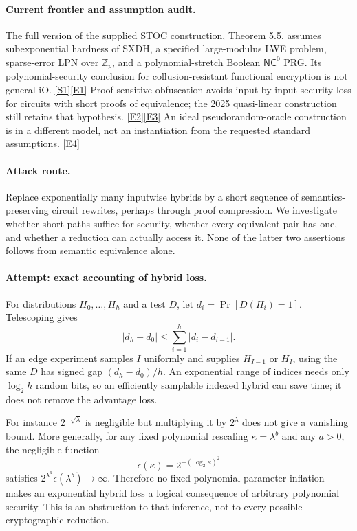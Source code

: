\documentclass[11pt,a4paper]{article}
\newcommand{\Z}{\mathbb{Z}}
\newcommand{\sref}[2]{\hyperlink{source:#1:#2}{[S#2]}}
\newcommand{\eref}[2]{\hyperlink{extra:#1:#2}{[E#2]}}
\numberwithin{equation}{section}
\begin{document}
\paragraph{Current frontier and assumption audit.}
The full version of the supplied STOC construction, Theorem 5.5, assumes
subexponential hardness of SXDH, a specified large-modulus LWE problem,
sparse-error LPN over $\Z_p$, and a polynomial-stretch Boolean
$\mathsf{NC}^0$ PRG. Its polynomial-security conclusion for collusion-resistant
functional encryption is not general iO. \sref{statement}{1}\eref{statement}{1}
Proof-sensitive obfuscation avoids input-by-input security loss for circuits
with short proofs of equivalence; the 2025 quasi-linear construction still
retains that hypothesis. \eref{statement}{2}\eref{statement}{3}
An ideal pseudorandom-oracle construction is in a different model, not an
instantiation from the requested standard assumptions. \eref{statement}{4}

\paragraph{Attack route.}
Replace exponentially many inputwise hybrids by a short sequence of
semantics-preserving circuit rewrites, perhaps through proof compression.
We investigate whether short paths suffice for security, whether every
equivalent pair has one, and whether a reduction can actually access it.
None of the latter two assertions follows from semantic equivalence alone.

\paragraph{Attempt: exact accounting of hybrid loss.}
For distributions $H_0,\ldots,H_h$ and a test $D$, let
$d_i=\Pr[D(H_i)=1]$. Telescoping gives
\begin{equation}\label{statement:hybrid}
 |d_h-d_0|\le\sum_{i=1}^h|d_i-d_{i-1}|.
\end{equation}
If an edge experiment samples $I$ uniformly and supplies $H_{I-1}$ or $H_I$,
using the same $D$ has signed gap $(d_h-d_0)/h$. An exponential range of
indices needs only $\log_2h$ random bits, so an efficiently samplable indexed
hybrid can save time; it does not remove the advantage loss.

For instance $2^{-\sqrt\lambda}$ is negligible but multiplying it by
$2^\lambda$ does not give a vanishing bound. More generally, for any fixed
polynomial rescaling $\kappa=\lambda^b$ and any $a>0$, the negligible function
\[
 \epsilon(\kappa)=2^{-(\log_2\kappa)^2}
\]
satisfies $2^{\lambda^a}\epsilon(\lambda^b)\to\infty$. Therefore no fixed
polynomial parameter inflation makes an exponential hybrid loss a logical
consequence of arbitrary polynomial security. This is an obstruction to
that inference, not to every possible cryptographic reduction.
\end{document}
